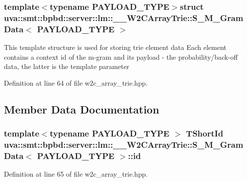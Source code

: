 \subsubsection*{template$<$typename P\+A\+Y\+L\+O\+A\+D\+\_\+\+T\+Y\+P\+E$>$struct uva\+::smt\+::bpbd\+::server\+::lm\+::\+\_\+\+\_\+\+W2\+C\+Array\+Trie\+::\+S\+\_\+\+M\+\_\+\+Gram\+Data$<$ P\+A\+Y\+L\+O\+A\+D\+\_\+\+T\+Y\+P\+E $>$}

This template structure is used for storing trie element data Each element contains a context id of the m-\/gram and its payload -\/ the probability/back-\/off data, the latter is the template parameter 

Definition at line 64 of file w2c\+\_\+array\+\_\+trie.\+hpp.



\subsection{Member Data Documentation}
\hypertarget{structuva_1_1smt_1_1bpbd_1_1server_1_1lm_1_1_____w2_c_array_trie_1_1_s___m___gram_data_a0b235c9677bb7fe150c1c0b9d400f2bc}{}
\subsubsection[{id}]{\setlength{\rightskip}{0pt plus 5cm}template$<$typename P\+A\+Y\+L\+O\+A\+D\+\_\+\+T\+Y\+P\+E $>$ {\bf T\+Short\+Id} {\bf uva\+::smt\+::bpbd\+::server\+::lm\+::\+\_\+\+\_\+\+W2\+C\+Array\+Trie\+::\+S\+\_\+\+M\+\_\+\+Gram\+Data}$<$ P\+A\+Y\+L\+O\+A\+D\+\_\+\+T\+Y\+P\+E $>$\+::id}\label{structuva_1_1smt_1_1bpbd_1_1server_1_1lm_1_1_____w2_c_array_trie_1_1_s___m___gram_data_a0b235c9677bb7fe150c1c0b9d400f2bc}


Definition at line 65 of file w2c\+\_\+array\+\_\+trie.\+hpp.

\hypertarget{structuva_1_1smt_1_1bpbd_1_1server_1_1lm_1_1_____w2_c_array_trie_1_1_s___m___gram_data_a765a646b8bca568bf1012b044d812ff7}{}
